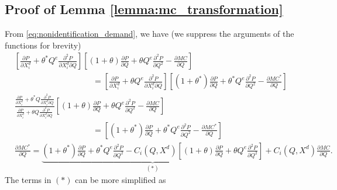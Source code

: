 \documentclass[11pt, a4paper]{article}
\theoremstyle{remark}
\begin{document}
\subsection{Proof of Lemma \ref{lemma:mc_transformation}}

From \eqref{eq:nonidentification_demand}, we have (we suppress the arguments of the functions for brevity)
\begin{align}
    &\left[\frac{\partial P}{\partial X^{d}_i} + \theta^{*} Q^e\frac{\partial^2 P}{\partial X^{d}_{i}\partial Q}\right]\left[(1+\theta)\frac{\partial P}{\partial Q} + \theta Q^e\frac{\partial^2 P}{\partial Q^2} - \frac{\partial MC}{\partial Q}\right] \\
    & \hspace{4cm}= \left[\frac{\partial P}{\partial X^{d}_i} + \theta Q^e\frac{\partial^2 P}{\partial X^{d}_{i}\partial Q}\right]\left[(1+\theta^{*})\frac{\partial P}{\partial Q} + \theta^{*} Q^e\frac{\partial^2 P}{\partial Q^2} - \frac{\partial MC^{*}}{\partial Q}
    \right]\\
    & \frac{\frac{\partial P}{\partial X^{d}_i} + \theta^{*} Q\frac{\partial^2 P}{\partial X^{d}_{i}\partial Q} }{\frac{\partial P}{\partial X^{d}_i} + \theta Q\frac{\partial^2 P}{\partial X^{d}_{i}\partial Q} }\left[(1+\theta)\frac{\partial P}{\partial Q} + \theta Q^e\frac{\partial^2 P}{\partial Q^2} - \frac{\partial MC}{\partial Q}\right]\\
    &\hspace{4cm} =\left[(1+\theta^{*})\frac{\partial P}{\partial Q} + \theta^{*} Q^e\frac{\partial^2 P}{\partial Q^2} - \frac{\partial MC^{*}}{\partial Q}
    \right]\\
    & \frac{\partial MC^{*}}{\partial Q} = \underbrace{(1+\theta^{*})\frac{\partial P}{\partial Q} + \theta^{*} Q^e\frac{\partial^2 P}{\partial Q^2} - C_i(Q, X^{d}) \left[(1+\theta)\frac{\partial P}{\partial Q} + \theta Q^e\frac{\partial^2 P}{\partial Q^2} \right]}_{(\ast)} + C_i(Q, X^{d})\frac{\partial MC}{\partial Q}.
\end{align}
The terms in $(\ast)$ can be more simplified as 
\end{document}
